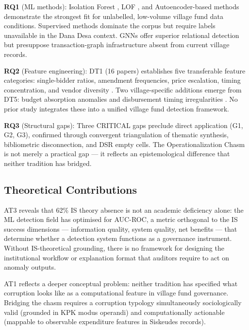 \documentclass[3p,times,procedia]{elsarticle}
\begin{document}
\textbf{RQ1} (ML methods): Isolation Forest \cite{p015}, LOF \cite{p041}, and
Autoencoder-based methods \cite{p003,p015} demonstrate the strongest fit for unlabelled,
low-volume village fund data conditions. Supervised methods dominate the corpus
\cite{p003,p007,p022,p026,p039} but require labels unavailable in the Dana Desa context.
GNNs offer superior relational detection \cite{p014,p045} but presuppose transaction-graph
infrastructure absent from current village records.

\textbf{RQ2} (Feature engineering): DT1 (16 papers) establishes five transferable
feature categories: single-bidder ratios, amendment frequencies, price escalation, timing
concentration, and vendor diversity \cite{p008,p043}. Two village-specific additions
emerge from DT5: budget absorption anomalies and disbursement timing irregularities
\cite{method_kpk2023}. No prior study integrates these into a unified village fund
detection framework.

\textbf{RQ3} (Structural gaps): Three CRITICAL gaps preclude direct application
(G1, G2, G3), confirmed through convergent triangulation of thematic synthesis,
bibliometric disconnection, and DSR empty cells. The Operationalization Chasm is not
merely a practical gap --- it reflects an epistemological difference that neither
tradition has bridged.

\subsection{Theoretical Contributions}

AT3 reveals that 62\% IS theory absence is not an academic deficiency alone: the ML
detection field has optimised for AUC-ROC, a metric orthogonal to the IS success
dimensions --- information quality, system quality, net benefits
\cite{method_delone2003} --- that determine whether a detection system functions as a
governance instrument. Without IS-theoretical grounding, there is no framework for
designing the institutional workflow or explanation format that auditors require to act
on anomaly outputs.

AT1 reflects a deeper conceptual problem: neither tradition has specified what corruption
looks like as a computational feature in village fund governance. Bridging the chasm
requires a corruption typology simultaneously sociologically valid (grounded in KPK
modus operandi) and computationally actionable (mappable to observable expenditure
features in Siskeudes records).
\end{document}
